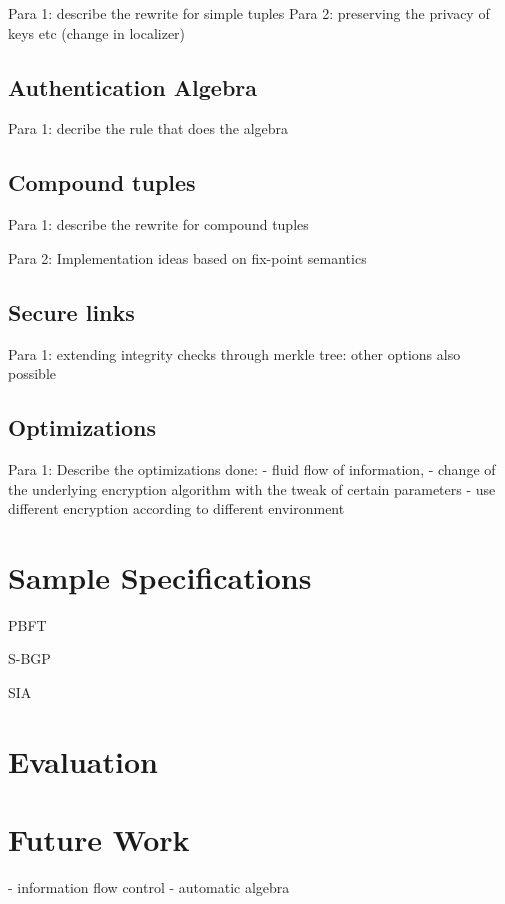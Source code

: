 Para 1: describe the rewrite for simple tuples
Para 2: preserving the privacy of keys etc (change in localizer)

\subsection{Authentication Algebra}

Para 1: decribe the rule that does the algebra

\subsection{Compound tuples}

Para 1: describe the rewrite for compound tuples

Para 2: Implementation ideas based on fix-point semantics

\subsection{Secure links}

Para 1: extending integrity checks through merkle tree: other options also possible

\subsection{Optimizations}

Para 1: Describe the optimizations done: 
- fluid flow of information, 
- change of the underlying encryption algorithm with the tweak of certain parameters
- use different encryption according to different environment

\section{Sample Specifications}

PBFT

S-BGP

SIA

\section{Evaluation}

\section{Future Work}

- information flow control
- automatic algebra
